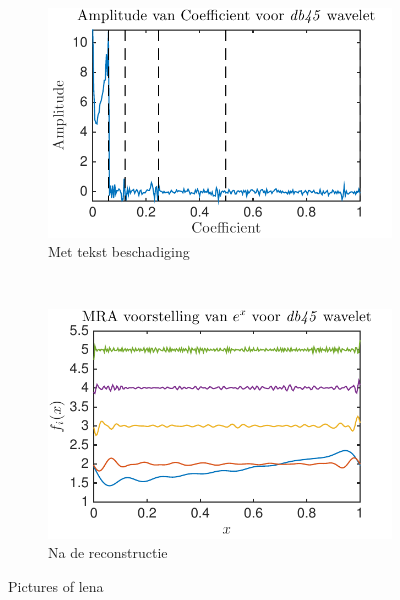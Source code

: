 \begin{figure}
\begin{subfigure}[b]{0.45\textwidth}
        \includegraphics[width=\textwidth]{../src/denoising/db45_Noise/coef_exp_db45_4_noise_10}
        \caption{Met tekst beschadiging}
        \label{fig:tiger}
    \end{subfigure}
    ~ %
    \begin{subfigure}[b]{0.45\textwidth}
        \includegraphics[width=\textwidth]{../src/denoising/db45_Noise/MRA_exp_db45_4_noise_10}
        \caption{Na de reconstructie}
        \label{fig:mouse}
    \end{subfigure}
    \caption{Pictures of lena}\label{fig:exp_Noise_noise_10}
\end{figure}






